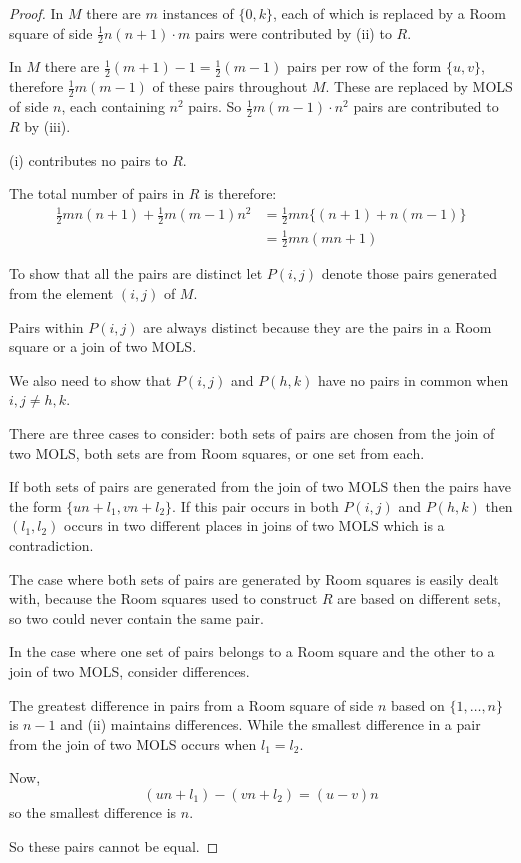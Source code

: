 \begin{proof}
In $M$ there are $m$ instances of $\{0, k\}$, each of which is replaced by a Room square of side $\frac{1}{2}n(n + 1) \cdot m$ pairs were contributed by (ii) to $R$.

In $M$ there are
$\frac{1}{2}(m + 1) - 1 = \frac{1}{2} (m  -1)$
pairs per row of the form $\{u, v\}$, therefore $\frac{1}{2}m(m - 1)$ of these pairs throughout $M$.
These are replaced by MOLS of side $n$, each containing $n^{2}$ pairs.
So $\frac{1}{2}m(m - 1) \cdot n^{2}$ pairs are contributed to $R$ by (iii). 

(i) contributes no pairs to $R$.

The total number of pairs in $R$ is therefore:
\begin{align*}
  \frac{1}{2} mn(n + 1) + \frac{1}{2}m(m - 1)n^2 &= \frac{1}{2}mn\{(n + 1) + n(m - 1)\} \\
  &= \frac{1}{2}mn(mn + 1)
\end{align*}

To show that all the pairs are distinct let $P(i, j)$ denote those pairs generated from the element $(i, j)$ of $M$.

Pairs within $P(i,j)$ are always distinct because they are the pairs in a Room square or a join of two MOLS.

We also need to show that $P(i, j)$ and $P(h, k)$ have no pairs in common when $i, j \neq h, k$.

There are three cases to consider: both sets of pairs are chosen from the join of two MOLS, both sets are from Room squares, or one set from each.

If both sets of pairs are generated from the join of two MOLS then the pairs have the form $\{un + l_{1}, vn + l_{2}\}$.
If this pair occurs in both $P(i, j)$ and $P(h, k)$ then $(l_{1}, l_{2})$ occurs in two different places in joins of two MOLS which is a contradiction.

The case where both sets of pairs are generated by Room squares is easily dealt with, because the Room squares used to construct $R$ are based on different sets, so two could never contain the same pair.

In the case where one set of pairs belongs to a Room square and the other to a join of two MOLS, consider differences.

The greatest difference in pairs from a Room square of side $n$ based on $\{1, \ldots, n\}$ is $n - 1$ and (ii) maintains differences.
While the smallest difference in a pair from the join of two MOLS occurs when $l_{1} = l_{2}$.

Now,
\begin{equation*}
  (un + l_1) - (vn + l_2) = (u - v)n
\end{equation*}
so the smallest difference is $n$.

So these pairs cannot be equal.
\end{proof}

